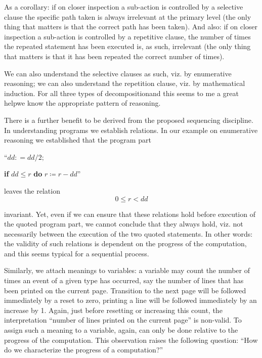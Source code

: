 As a corollary: if on closer inspection a sub-action is controlled by a selective clause the specific path taken is always irrelevant at the primary level (the only thing that matters is that the correct path has been taken). And also: if on closer inspection a sub-action is controlled by a repetitive clause, the number of times the repeated statement has been executed is, as such, irrelevant (the only thing that matters is that it has been repeated the correct number of times).

We can also understand the selective clauses as such, viz. by enumerative reasoning; we can also understand the repetition clause, viz. by mathematical induction. For all three types of decomposition\textemdash{}and this seems to me a great help\textemdash{}we know the appropriate pattern of reasoning.

There is a further benefit to be derived from the proposed sequencing discipline. In understanding programs we establish relations. In our example on enumerative reasoning we established that the program part
\medskip

{
	\setlength{\parindent}{8em}
	\hspace{-.4em}``$dd: = dd/2;$
	
	\textbf{if} $dd \leqslant r$ \textbf{do} $r \coloneq r - dd$''
}
\medskip

\noindent
leaves the relation
$$
0 \leqslant r < dd
$$

\noindent
invariant. Yet, even if we can ensure that these relations hold before execution of the quoted program part, we cannot conclude that they always hold, viz. not necessarily between the execution of the two quoted statements. In other words: the validity of such relations is dependent on the progress of the computation, and this seems typical for a sequential process.

Similarly, we attach meanings to variables: a variable may count the number of times an event of a given type has occurred, say the number of lines that has been printed on the current page. Transition to the next page will be followed immediately by a reset to zero, printing a line will be followed immediately by an increase by 1. Again, just before resetting or increasing this count, the interpretation ``number of lines printed on the current page'' is non-valid. To assign such a meaning to a variable, again, can only be done relative to the progress of the computation. This observation raises the following question: ``How do we characterize the progress of a computation?''

